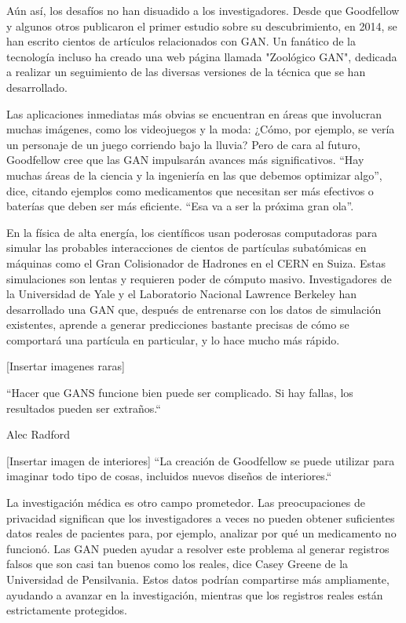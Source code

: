 \documentclass[a4paper]{article}
\begin{document}
Aún así, los desafíos no han disuadido a los investigadores. Desde que Goodfellow y algunos otros publicaron el primer estudio sobre su
descubrimiento, en 2014, se han escrito cientos de artículos relacionados con GAN. Un fanático de la tecnología incluso ha creado una web
página llamada "Zoológico GAN", dedicada a realizar un seguimiento de las diversas versiones de la técnica que se han
desarrollado.

Las aplicaciones inmediatas más obvias se encuentran en áreas que involucran muchas imágenes, como los videojuegos y la moda:
¿Cómo, por ejemplo, se vería un personaje de un juego corriendo bajo la lluvia? Pero de cara al futuro, Goodfellow cree que las GAN impulsarán avances más significativos. “Hay muchas áreas de la ciencia y la ingeniería en las que debemos
optimizar algo”, dice, citando ejemplos como medicamentos que necesitan ser más efectivos o baterías que deben
ser más eficiente. “Esa va a ser la próxima gran ola”.

En la física de alta energía, los científicos usan poderosas computadoras para simular las probables interacciones de cientos de partículas subatómicas en máquinas como el Gran Colisionador de Hadrones en el CERN en Suiza. Estas simulaciones son lentas y requieren poder de cómputo masivo. Investigadores de la Universidad de Yale y el Laboratorio Nacional Lawrence Berkeley han desarrollado una GAN que, después de entrenarse con los datos de simulación existentes, aprende a generar predicciones bastante precisas de cómo se comportará una partícula en particular, y lo hace mucho más rápido.

[Insertar imagenes raras]

``Hacer que GANS funcione bien puede ser complicado. Si hay fallas, los resultados pueden ser extraños.``

\begin{flushright}
Alec Radford
\end{flushright}


[Insertar imagen de interiores]
``La creación de Goodfellow se puede utilizar para imaginar todo tipo de cosas, incluidos nuevos diseños de interiores.``



{\ttfamily
La investigación médica es otro campo prometedor. Las preocupaciones de privacidad significan que los investigadores a veces no pueden obtener suficientes datos reales de pacientes para, por ejemplo, analizar por qué un medicamento no funcionó. Las GAN pueden ayudar a resolver este problema al generar registros falsos que son casi tan buenos como los reales, dice Casey Greene de la Universidad de Pensilvania. Estos datos podrían compartirse más ampliamente, ayudando a avanzar en la investigación, mientras que los registros reales están estrictamente protegidos. }
\end{document}
